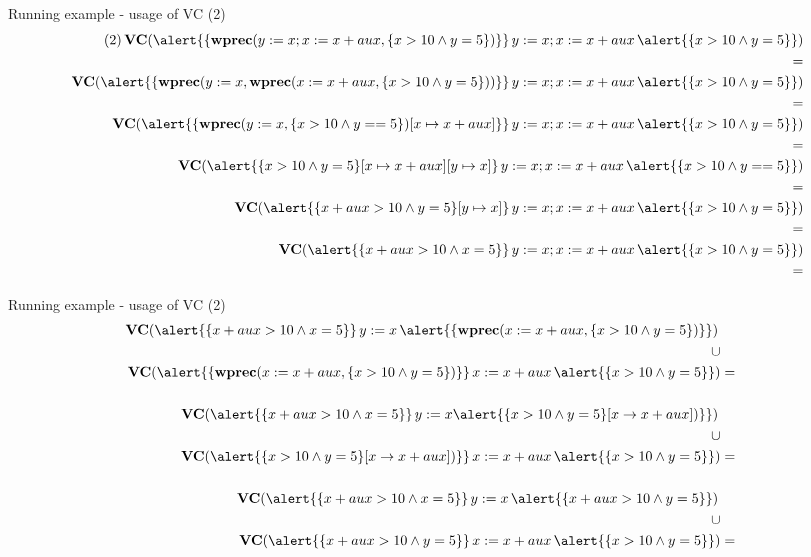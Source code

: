 \documentclass[aspectratio=169]{beamer}
\begin{document}
\begin{slide}{Running example - usage of VC (2)}
\footnotesize{
\begin{align*}
(2)\,\textbf{VC}(\alert{\{\textbf{wprec}(y := x; x := x + aux, \{x > 10 \land y = 5\})\}}\,y := x; x := x + aux\,\alert{\{x > 10 \land y = 5\}}) \\ = \\
\textbf{VC}(\alert{\{\textbf{wprec}(y := x,\textbf{wprec}(x := x + aux, \{x > 10 \land y = 5\}))\}}\,y := x; x := x + aux\,\alert{\{x > 10 \land y = 5\}}) \\ = \\
\textbf{VC}(\alert{\{\textbf{wprec}(y := x,\{x > 10 \land y == 5\})[x \mapsto x + aux]\}}\,y := x; x := x + aux\,\alert{\{x > 10 \land y = 5\}}) \\ = \\
\textbf{VC}(\alert{\{x > 10 \land y = 5\}[x \mapsto x + aux][y \mapsto x]}\,y := x; x := x + aux\,\alert{\{x > 10 \land y == 5\}}) \\ = \\
\textbf{VC}(\alert{\{x + aux > 10 \land y = 5\}[y \mapsto x]}\,y := x; x := x + aux\,\alert{\{x > 10 \land y = 5\}}) \\ = \\
\textbf{VC}(\alert{\{x + aux > 10 \land x = 5\}}\,y := x; x := x + aux\,\alert{\{x > 10 \land y = 5\}}) \\ = 
\end{align*}  
}
\end{slide}


\begin{slide}{Running example - usage of VC (2)}
\scriptsize{
\begin{align*}
\textbf{VC}(\alert{\{x + aux > 10 \land x = 5\}}\,
y := x\,
\alert{\{\textbf{wprec}(x := x + aux,\{x > 10 \land y = 5\})\}})\,\\ \cup \\
\textbf{VC}(\alert{\{\textbf{wprec}(x := x + aux,\{x > 10 \land y = 5\})\}}\,
x := x + aux\,
\alert{\{x > 10 \land y = 5\}}) & = \\ \\
\textbf{VC}(\alert{\{x + aux > 10 \land x = 5\}}\,y := x\alert{\{x > 10 \land y = 5\}[x \to x + aux])\}})\,\\\cup \\
\textbf{VC}(\alert{\{x > 10 \land y = 5\}[x \to x + aux])\}}\,x := x + aux\,\alert{\{x > 10 \land y = 5\}}) & = \\ \\
\textbf{VC}(\alert{\{x + aux > 10 \land x = 5\}}\,y := x\,\alert{\{x + aux > 10 \land y = 5\}})\,\\\cup \\
\textbf{VC}(\alert{\{x + aux > 10 \land y = 5\}}\,x := x + aux\,\alert{\{x > 10 \land y = 5\}}) & =
\end{align*}
}  
\end{slide}
\end{document}
